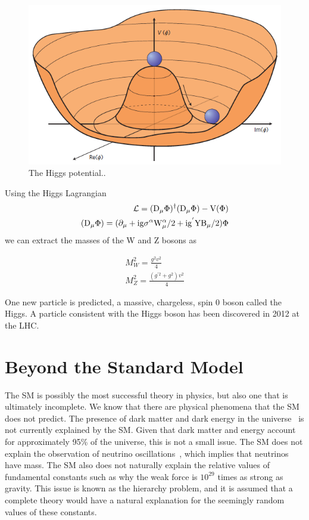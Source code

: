 \begin{figure}
\begin{center}
\includegraphics[width=0.7\linewidth]{figs/higgspotential.png}
\caption{The Higgs potential..}
\label{figs:higgspotential}
\end{center}
\end{figure}

Using the Higgs Lagrangian
\begin{eqnarray}
\cal{L} = \mathrm{(D_{\mu} \Phi )^{\dagger}(D_{\mu} \Phi ) -V( \Phi )}\\
\mathrm{(D_{\mu}\Phi) = (\partial_{\mu}+i g \sigma^{\alpha} W_{\mu}^{\alpha}/2 +i g^{'} Y B_{\mu}/2)\Phi}
\end{eqnarray}  
we can extract the masses of the W and Z bosons as

\begin{eqnarray}
M_{W}^2 = \frac{g^{2}v^{2}}{4}\\
M_{Z}^2 = \frac{(g^{'2}+g^{2})v^{2}}{4}
\end{eqnarray}  

One new particle is predicted, a massive, chargeless, spin 0 boson called the Higgs.  
A particle consistent with the Higgs boson has been discovered in 2012 at the LHC.  

  
\section{Beyond the Standard Model}
\label{sec:BSMtheory}
The SM is possibly the most successful theory in physics, but also one that is ultimately incomplete.  
We know that there are physical phenomena that the SM does not predict.  
The presence of dark matter and dark energy in the universe~\cite{Bennett:2003ba} is not currently explained by the SM.  
Given that dark matter and energy account for approximately 95\% of the universe, this is not a small issue.  
The SM does not explain the observation of neutrino oscillations~\cite{An:2012eh}, which implies that neutrinos have mass.  
The SM also does not naturally explain the relative values of fundamental constants such as why the weak force is $10^{29}$ times as strong as gravity.  
This issue is known as the hierarchy problem, and it is assumed that a complete theory would have a natural explanation for the seemingly random values of these constants.  

